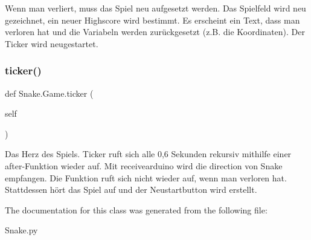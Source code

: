 \begin{DoxyVerb}Wenn man verliert, muss das Spiel neu aufgesetzt werden.
Das Spielfeld wird neu gezeichnet, ein neuer Highscore wird bestimmt. 
Es erscheint ein Text, dass man verloren hat und die Variabeln werden
zurückgesetzt (z.B. die Koordinaten). Der Ticker wird neugestartet.
\end{DoxyVerb}
 \mbox{\label{class_snake_1_1_game_a7b60758212d640631d9fdb6d4f7af472}} 
\subsubsection{\texorpdfstring{ticker()}{ticker()}}
{\footnotesize\ttfamily def Snake.\+Game.\+ticker (\begin{DoxyParamCaption}\item[{}]{self }\end{DoxyParamCaption})}

\begin{DoxyVerb}Das Herz des Spiels. Ticker ruft sich alle 0,6 Sekunden rekursiv mithilfe einer after-Funktion wieder auf.
Mit receivearduino wird die direction von Snake empfangen.
Die Funktion ruft sich nicht wieder auf, wenn man verloren hat. Stattdessen hört das Spiel auf und der
Neustartbutton wird erstellt.
\end{DoxyVerb}
 

The documentation for this class was generated from the following file\+:\begin{DoxyCompactItemize}
\item 
Snake.\+py\end{DoxyCompactItemize}
